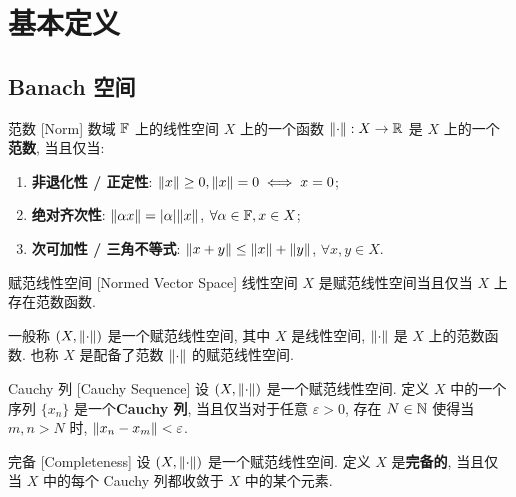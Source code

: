 \section{基本定义}

    \subsection{Banach 空间}

        \begin{dfn}
            [norm]
            {范数}
            [Norm]
            数域 \(\operatorname{\mathbb{F}}\) 上的线性空间 $X$ 上的一个函数 $\norm{\cdot}:X\to\operatorname{\mathbb{R}}$ 是 $X$ 上的一个\textbf{范数}, 当且仅当:
            \begin{enumerate}[label=(\roman*)]
                \item \textbf{非退化性 / 正定性}: $\norm{x}\geq 0, \norm{x}=0\iff x=0$;
                \item \textbf{绝对齐次性}: $\norm{\alpha x}=\abs{\alpha}\norm{x}$, $\forall \alpha\in\operatorname{\mathbb{F}}, x\in X$;
                \item \textbf{次可加性 / 三角不等式}: $\norm{x+y}\leq\norm{x}+\norm{y}$, $\forall x,y\in X$.
            \end{enumerate}
        \end{dfn}

        \begin{dfn}
            [nvs]
            {赋范线性空间}
            [Normed Vector Space]
            线性空间 \(X\) 是赋范线性空间当且仅当 \(X\) 上存在范数函数.
        \end{dfn}

        \begin{rmk}
            [Dedicatia]
            一般称 \((X, \norm{\cdot})\) 是一个赋范线性空间, 其中 \(X\) 是线性空间, \(\norm{\cdot}\) 是 \(X\) 上的范数函数. 也称 \(X\) 是配备了范数 \(\norm{\cdot}\) 的赋范线性空间.
        \end{rmk}

        \begin{dfn}
            {Cauchy 列}
            [Cauchy Sequence]
            设 \((X, \norm{\cdot})\) 是一个赋范线性空间. 定义 \(X\) 中的一个序列 \(\{x_n\}\) 是一个\textbf{Cauchy 列}, 当且仅当对于任意 \(\varepsilon>0\), 存在 \(N\in\operatorname{\mathbb{N}}\) 使得当 \(m,n>N\) 时, \(\norm{x_n-x_m}<\varepsilon\).
        \end{dfn}
        
        \begin{dfn}
            [complete]
            {完备}
            [Completeness]
            设 \((X, \norm{\cdot})\) 是一个赋范线性空间. 定义 \(X\) 是\textbf{完备的}, 当且仅当 \(X\) 中的每个 Cauchy 列都收敛于 \(X\) 中的某个元素.
        \end{dfn}

